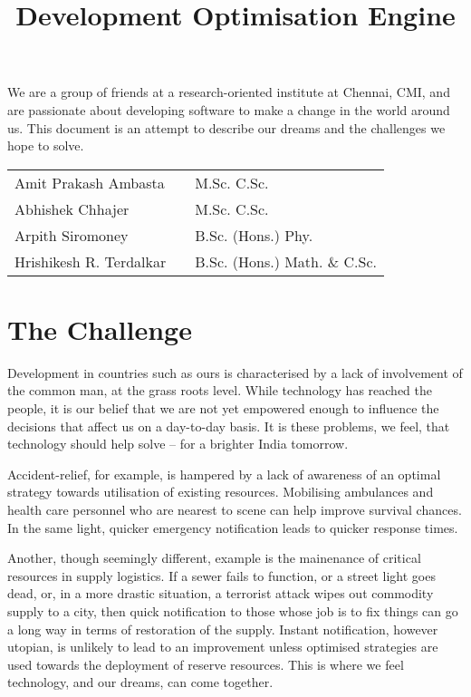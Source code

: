 \documentclass{report}
\begin{document}
\title{Development Optimisation Engine}

\maketitle
We are a group of friends at a research-oriented institute at Chennai, CMI, and are passionate about developing software to make a change in the world around us.  This document is an attempt to describe our dreams and the challenges we hope to solve.

\begin{tabular}{l|ll}
Amit Prakash Ambasta & & M.Sc. C.Sc.\\
Abhishek Chhajer & & M.Sc. C.Sc.\\
Arpith Siromoney & & B.Sc. (Hons.) Phy.\\
Hrishikesh R. Terdalkar & & B.Sc. (Hons.) Math. \& C.Sc.\\
\end{tabular}

\section*{The Challenge}
Development in countries such as ours is characterised by a lack of involvement of the common man, at the grass roots level.  While technology has reached the people, it is our belief that we are not yet empowered enough to influence the decisions that affect us on a day-to-day basis.  It is these problems, we feel, that technology should help solve -- for a brighter India tomorrow.

Accident-relief, for example, is hampered by a lack of awareness of an optimal strategy towards utilisation of existing resources.  Mobilising ambulances and health care personnel who are nearest to scene can help improve survival chances.  In the same light, quicker emergency notification leads to quicker response times.

Another, though seemingly different, example is the mainenance of critical resources in supply logistics.  If a sewer fails to function, or a street light goes dead, or, in a more drastic situation, a terrorist attack wipes out commodity supply to a city, then quick notification to those whose job is to fix things can go a long way in terms of restoration of the supply.  Instant notification, however utopian, is unlikely to lead to an improvement unless optimised strategies are used towards the deployment of reserve resources.  This is where we feel technology, and our dreams, can come together.
\end{document}
